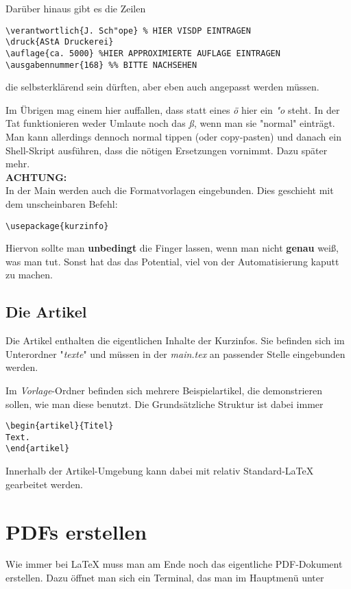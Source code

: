 \documentclass[a4paper,10pt]{article}
\begin{document}
Darüber hinaus gibt es die Zeilen
\begin{verbatim}
\verantwortlich{J. Sch"ope} % HIER VISDP EINTRAGEN
\druck{AStA Druckerei}
\auflage{ca. 5000} %HIER APPROXIMIERTE AUFLAGE EINTRAGEN
\ausgabennummer{168} %% BITTE NACHSEHEN
\end{verbatim}
die selbsterklärend sein dürften, aber eben auch angepasst werden müssen.

Im Übrigen mag einem hier auffallen, dass statt eines \textit{ö} hier ein \textit{"o} steht. In der Tat funktionieren weder Umlaute noch das \textit{ß}, wenn man sie "normal" einträgt. Man kann allerdings dennoch normal tippen (oder copy-pasten) und danach ein Shell-Skript ausführen, dass die nötigen Ersetzungen vornimmt. Dazu später mehr.\\



\textbf{\huge ACHTUNG:}\\
In der Main werden auch die Formatvorlagen eingebunden. Dies geschieht mit dem unscheinbaren Befehl:
\begin{verbatim}
\usepackage{kurzinfo}
\end{verbatim}
Hiervon sollte man \textbf{unbedingt} die Finger lassen, wenn man nicht \textbf{genau} weiß, was man tut. Sonst hat das das Potential, viel von der Automatisierung kaputt zu machen.

\subsection*{Die Artikel}
Die Artikel enthalten die eigentlichen Inhalte der Kurzinfos. Sie befinden sich im Unterordner "\textit{texte}" und müssen in der \textit{main.tex} an passender Stelle eingebunden werden.

Im \textit{Vorlage}-Ordner befinden sich mehrere Beispielartikel, die demonstrieren sollen, wie man diese benutzt. Die Grundsätzliche Struktur ist dabei immer
\begin{verbatim}
\begin{artikel}{Titel}
Text.
\end{artikel}
\end{verbatim}

Innerhalb der Artikel-Umgebung kann dabei mit relativ Standard-\LaTeX{} gearbeitet werden.


\section{PDFs erstellen}
Wie immer bei \LaTeX{} muss man am Ende noch das eigentliche PDF-Dokument erstellen. Dazu öffnet man sich ein Terminal, das man im Hauptmenü unter\\
\end{document}
